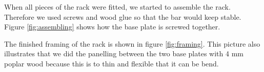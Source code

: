 \documentclass{acm_proc_article-sp}
\begin{document}
When all pieces of the rack were fitted, we started to assemble the rack. Therefore we used screws and wood glue so that the bar would keep stable. Figure \ref{fig:assembling} shows how the base plate is screwed together.

\begin{minipage}{\linewidth}%
\label{fig:framing}%
\end{minipage}


The finished framing of the rack is shown in figure \ref{fig:framing}. This picture also illustrates that we did the panelling between the two base plates with 4 mm poplar wood because this is to thin and flexible that it can be bend.

\begin{minipage}{\linewidth}%
\label{fig:filling}%
\end{minipage}
\end{document}

